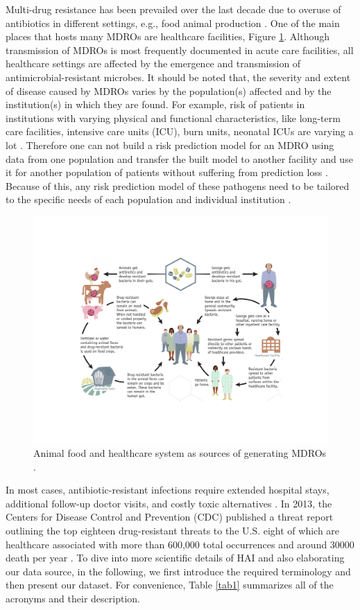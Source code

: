 Multi-drug resistance has been prevailed over the last decade due to overuse of antibiotics in different settings, e.g., food animal production \cite{landers2012review}. One of the main places that hosts many MDROs are healthcare facilities, Figure \ref{resistant}. Although transmission of MDROs is most frequently documented in acute care facilities, all healthcare settings are affected by the emergence and transmission of antimicrobial-resistant microbes. It should be noted that, the severity and extent of disease caused by MDROs varies by the population(s) affected and by the institution(s) in which they are found. For example, risk of patients in institutions with varying physical and functional characteristics, like long-term care facilities, intensive care units (ICU), burn units, neonatal ICUs are varying a lot \cite{siegel2007management}. Therefore one can not build a risk prediction model for an MDRO using data from one population and transfer the built model to another facility and use it for another population of patients without suffering from prediction loss \cite{wiens2014study}. Because of this, any risk prediction model of these pathogens need to be tailored to the specific needs of each population and individual institution \cite{siegel2007management, wiens2014study}. 

\begin{figure}
	\centering
	\includegraphics[width=.7\textwidth]{./img/resistant.pdf}
	\caption{Animal food and healthcare system as sources of generating MDROs \cite{resistance}.}
	\label{resistant}
\end{figure}

In most cases, antibiotic-resistant infections require extended hospital stays, additional follow-up doctor visits, and costly toxic alternatives \cite{amr, resistance}. In 2013, the Centers for Disease Control and Prevention (CDC) published a threat report outlining the top eighteen drug-resistant threats to the U.S. eight of which are healthcare associated with more than 600,000 total occurrences and around 30000 death per year \cite{resistance}. To dive into more scientific details of HAI and also elaborating our data source, in the following, we first introduce the required terminology and then present our dataset. For convenience, Table \ref{tab1} summarizes all of the acronyms and their description. 

